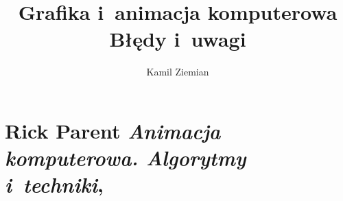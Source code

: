 \documentclass[a4paper,11pt]{article}
\title{Grafika i~animacja komputerowa \\
  {\Large Błędy i~uwagi}}
\author{Kamil Ziemian}
\numberwithin{equation}{section}
\begin{document}





\maketitle










\section{Rick Parent \textit{Animacja komputerowa. Algorytmy
    i~techniki},
  \parencite{}}

\label{sec:Parent}





\noindent






\noindent










\end{document}
